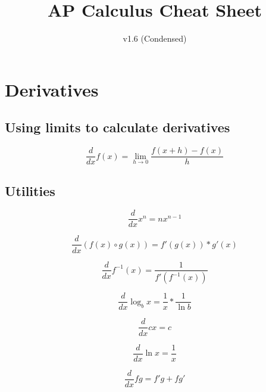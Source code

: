 \documentclass[12pt, english]{article}
\date{}
\title{ AP Calculus Cheat Sheet }
\begin{document}
\author{
	v1.6 (Condensed)
}

\maketitle

\section{Derivatives}
\subsection{Using limits to calculate derivatives}
	\begin{equation}
		\frac{d}{dx} f(x) = \lim_{h \to 0} \frac{f(x+h)-f(x)}{h}
	\end{equation}

\subsection{Utilities}
\begin{equation}
	\frac{d}{dx} x^n = nx^{n-1}
\end{equation}

\noindent
{}
\begin{equation}
	\frac{d}{dx} (f(x) \circ g(x)) = f'(g(x)) * g'(x)
\end{equation}

\noindent
{}
\begin{equation}
	\frac{d}{dx} f^{-1}(x) = \frac{1}{f'(f^{-1}(x))} 
\end{equation}

\noindent
{}
\begin{equation}
	\frac{d}{dx} \log_{b} x = \frac{1}{x} * \frac{1}{\ln b} 
\end{equation}

\noindent
{}
\begin{equation}
	\frac{d}{dx} cx = c 
\end{equation}

\noindent
{}
\begin{equation}
	\frac{d}{dx} \ln x = \frac{1}{x} 
\end{equation}

\noindent
{}
\begin{equation}
	\frac{d}{dx} fg = f'g + fg'
\end{equation}
\end{document}
